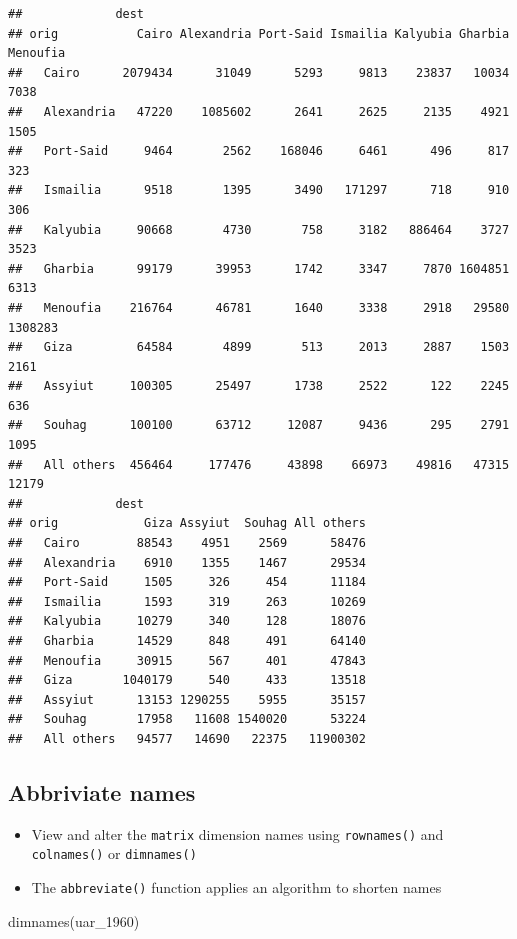 \documentclass[
]{book}
\newenvironment{Shaded}{\begin{snugshade}}{\end{snugshade}}
\newcommand{\FunctionTok}[1]{\textcolor[rgb]{0.00,0.00,0.00}{#1}}
\newcommand{\NormalTok}[1]{#1}
\providecommand{\tightlist}{%
  \setlength{\itemsep}{0pt}\setlength{\parskip}{0pt}}
\begin{document}
\begin{verbatim}
##             dest
## orig           Cairo Alexandria Port-Said Ismailia Kalyubia Gharbia Menoufia
##   Cairo      2079434      31049      5293     9813    23837   10034     7038
##   Alexandria   47220    1085602      2641     2625     2135    4921     1505
##   Port-Said     9464       2562    168046     6461      496     817      323
##   Ismailia      9518       1395      3490   171297      718     910      306
##   Kalyubia     90668       4730       758     3182   886464    3727     3523
##   Gharbia      99179      39953      1742     3347     7870 1604851     6313
##   Menoufia    216764      46781      1640     3338     2918   29580  1308283
##   Giza         64584       4899       513     2013     2887    1503     2161
##   Assyiut     100305      25497      1738     2522      122    2245      636
##   Souhag      100100      63712     12087     9436      295    2791     1095
##   All others  456464     177476     43898    66973    49816   47315    12179
##             dest
## orig            Giza Assyiut  Souhag All others
##   Cairo        88543    4951    2569      58476
##   Alexandria    6910    1355    1467      29534
##   Port-Said     1505     326     454      11184
##   Ismailia      1593     319     263      10269
##   Kalyubia     10279     340     128      18076
##   Gharbia      14529     848     491      64140
##   Menoufia     30915     567     401      47843
##   Giza       1040179     540     433      13518
##   Assyiut      13153 1290255    5955      35157
##   Souhag       17958   11608 1540020      53224
##   All others   94577   14690   22375   11900302
\end{verbatim}

\hypertarget{abbriviate-names}{%
\subsection{Abbriviate names}\label{abbriviate-names}}

\begin{itemize}
\tightlist
\item
  View and alter the \texttt{matrix} dimension names using \texttt{rownames()} and \texttt{colnames()} or \texttt{dimnames()}
\item
  The \texttt{abbreviate()} function applies an algorithm to shorten names
\end{itemize}

\begin{Shaded}
\begin{Highlighting}[]
\FunctionTok{dimnames}\NormalTok{(uar\_1960)}
\end{Highlighting}
\end{Shaded}
\end{document}
